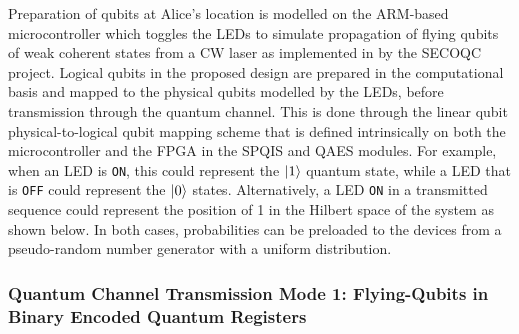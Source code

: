 Preparation of qubits at Alice's location is modelled on the ARM-based microcontroller which toggles the LEDs to simulate propagation of flying qubits of weak coherent states from a CW laser as implemented in by the SECOQC project. Logical qubits in the proposed design are prepared in the computational basis and mapped to the physical qubits modelled by the LEDs, before transmission through the quantum channel. This is done through the linear qubit physical-to-logical qubit mapping scheme that is defined intrinsically on both the microcontroller and the FPGA in the SPQIS and QAES modules. For example, when an LED is \texttt{ON}, this could represent the $\ket{1}$ quantum state, while a LED that is \texttt{OFF} could represent the $\ket{0}$ states. Alternatively, a LED \texttt{ON} in a transmitted sequence could represent the position of 1 in the Hilbert space of the system as shown below. In both cases, probabilities can be preloaded to the devices from a pseudo-random number generator with a uniform distribution. 

\subsubsection{Quantum Channel Transmission Mode 1: Flying-Qubits in Binary Encoded Quantum Registers}

